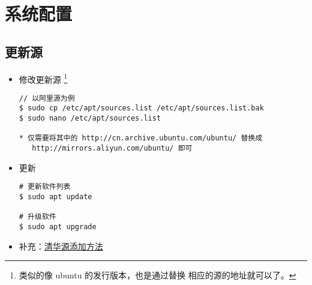 \chapter{系统配置}
\section{更新源}

\begin{itemize}
\item 修改更新源 \footnote{类似的像 ubuntu 的发行版本，也是通过替换 相应的源的地址就可以了。}
\begin{lstlisting}
// 以阿里源为例
$ sudo cp /etc/apt/sources.list /etc/apt/sources.list.bak  
$ sudo nano /etc/apt/sources.list

* 仅需要将其中的 http://cn.archive.ubuntu.com/ubuntu/ 替换成 
   http://mirrors.aliyun.com/ubuntu/ 即可 
\end{lstlisting}

\item 更新
\begin{lstlisting}
# 更新软件列表
$ sudo apt update  

# 升级软件 
$ sudo apt upgrade 
\end{lstlisting}


\item 补充：\href{https://mirrors.tuna.tsinghua.edu.cn/help/ubuntu/}{清华源添加方法}
\end{itemize}

